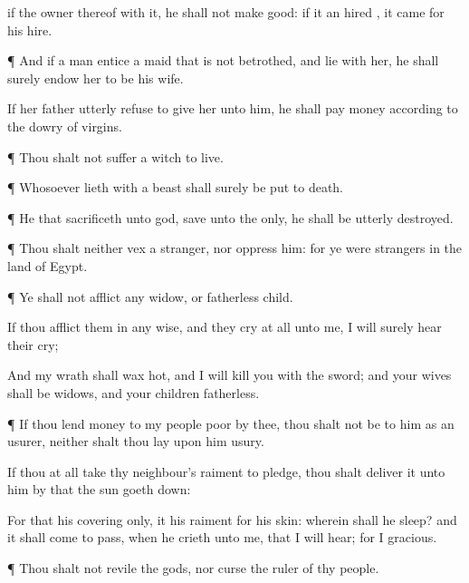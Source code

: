 { if the
owner thereof
{} with it, he shall not make
{}
good: if it
{} an
hired
{}, it
came for his
hire.


\par }{\PP {}¶ And if a
man
entice a
maid that is not
betrothed, and
lie with her, he shall
surely
endow her to be his
wife.

If her
father
utterly
refuse to
give her unto him, he shall
pay
money according to the
dowry of
virgins.


\par }{\PP {}¶ Thou shalt not suffer a
witch to
live.


\par }{\PP {}¶ Whosoever
lieth with a
beast shall
surely be put to
death.


\par }{\PP {}¶ He that
sacrificeth unto
{}
god,
save unto the
{} only, he shall be utterly
destroyed.


\par }{\PP {}¶ Thou shalt neither
vex a
stranger, nor
oppress him: for ye were
strangers in the
land of
Egypt.


\par }{\PP {}¶ Ye shall not
afflict any
widow, or fatherless
child.

If thou
afflict them in any
wise, and they
cry at
all unto me, I will
surely
hear their
cry;

And my
wrath shall wax
hot, and I will
kill you with the
sword; and your
wives shall be
widows, and your
children
fatherless.


\par }{\PP {}¶ If thou
lend
money to
{} my
people
{}
poor by thee, thou shalt not be to him as an
usurer, neither shalt thou
lay upon him
usury.

If thou at
all
take thy
neighbour’s
raiment to
pledge, thou shalt
deliver it unto him
by that the
sun goeth
down:

For that
{} his
covering only, it
{} his
raiment for his
skin: wherein shall he
sleep? and it shall come to pass, when he
crieth unto me, that I will
hear; for I
{}
gracious.


\par }{\PP {}¶ Thou shalt not
revile the
gods, nor
curse the
ruler of thy
people.


}
